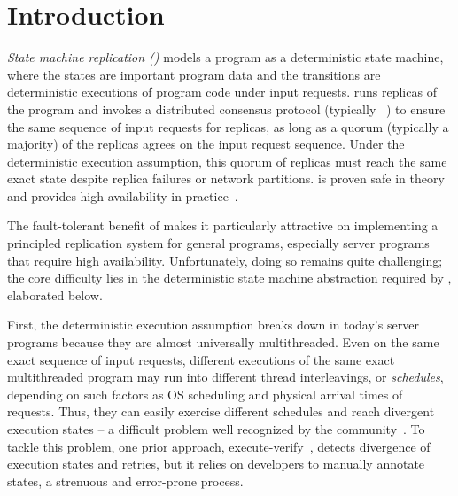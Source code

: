 \section{Introduction} \label{sec:intro}

\emph{State machine replication (\smr)} models a program as a deterministic 
state machine, where the states are important program data and the transitions 
are deterministic executions of program code under input requests.  \smr runs 
replicas of the program and invokes a distributed consensus protocol (typically 
\paxos~\cite{paxos,paxos:simple,paxos:complex}) to ensure the same sequence of 
input requests for replicas, as long as a quorum (typically a majority) of the 
replicas agrees on the input request sequence. Under the deterministic execution 
assumption, this quorum of replicas must reach the same exact state despite 
replica failures or network partitions.  \smr is proven safe in 
theory and provides high availability in 
practice~\cite{paxos:live,paxos:practical,chubby:osdi,paxos:datastore, 
bolosky:nsdi11,mencius:osdi08,eve:osdi12,rex:eurosys14}.

The fault-tolerant benefit of \smr makes it particularly attractive on 
implementing a principled replication system for general programs, especially 
server programs that require high availability.  Unfortunately, doing so remains
quite challenging; the core difficulty lies in the deterministic state
machine abstraction required by \smr, elaborated below.

First, the deterministic execution assumption breaks down in today's
server programs because they are almost universally multithreaded. Even on the 
same exact sequence of input requests, different executions of the same exact 
multithreaded program may run into different thread interleavings, or 
\emph{schedules}, depending on such factors as OS scheduling and physical 
arrival times of requests. Thus, they can easily exercise different schedules 
and reach divergent execution states -- a difficult problem well recognized by 
the community~\cite{dos:osdi10,eve:osdi12,ddos:asplos13,rex:eurosys14}.
To tackle this problem, one prior approach,
execute-verify~\cite{eve:osdi12}, detects divergence of execution states
and retries, but it relies on developers to manually annotate states, a
strenuous and error-prone process.

